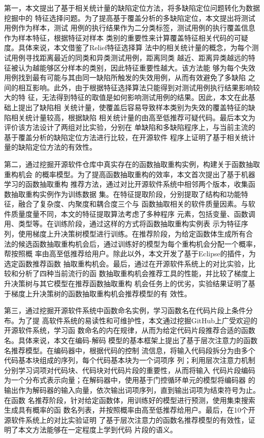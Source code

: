 第一，本文提出了基于相关统计量的缺陷定位方法，将多缺陷定位问题转化为数据挖掘中的
特征选择问题。为了提高基于覆盖分析的多缺陷定位，本文提出将测试用例作为样本，测试
用例的执行结果作为二分类标签，测试用例的执行覆盖信息作为样本特征，根据特征对样本
类别的重要性来计算覆盖特征相关代码的可疑度。具体来说，本文借鉴了Relief特征选择算
法中的相关统计量的概念，为每个测试用例寻找距离最近的同类和异类测试用例，距离同类
越近、距离异类越远的特征被认为越能够区分样本的类别，因此特征重要性越大。该方法能
够为每个失效用例找到最有可能与其由同一缺陷所触发的失效用例，从而有效避免了多缺陷
之间的相互影响。此外，由于根据特征选择算法只能得到对测试用例执行结果影响较大的特
征，无法得到特征的取值是如何影响测试用例的结果。因此，本文在此基础上提出了缺陷相
关统计量，使覆盖后容易导致样本类别为失效的覆盖特征的缺陷相关统计量较高，根据缺陷
相关统计量的由高至低推荐可疑代码。最后本文为评价该方法设计了两组对比实验，分别在
单缺陷和多缺陷程序上，与当前主流的基于覆盖分析的缺陷定位方法进行比较，在开源软件
程序上证明了基于相关统计量的缺陷定位方法的有效性。

第二，通过挖掘开源软件仓库中真实存在的函数抽取重构实例，构建关于函数抽取重构机会
的概率模型。为了提高函数抽取重构的效率，本文首次提出了基于机器学习的函数抽取重构
推荐方法，通过对比开源软件系统中相邻两个版本，收集函数抽取重构实例作为训练数据
集。在特征提取阶段，分别提取了结构和功能特征，融合了复杂度、内聚度和耦合度三个与
函数抽取相关的软件质量因素。与软件质量度量不同，本文的特征提取算法考虑了多种程序
元素，包括变量、函数调用、类型等。在训练阶段，通过这样的方式将函数抽取重构实例表
示为特征序列，使用梯度上升决策树模型进行训练。在推荐阶段，为给定函数体生成所有合
法的候选函数抽取重构机会后，通过训练好的模型为每个重构机会分配一个概率，帮按照概
率由高至低推荐给用户。除此以外，本文开发了基于Eclipse的插件，为选定函数推荐函数
抽取重构机会。最后，通过在开源软件系统上的对比实验，比较和分析了四种当前流行的函
数抽取重构机会推荐工具的性能，并比较了梯度上升决策树与其它模型在推荐函数抽取重构
机会任务上的优劣，实验结果证明了基于梯度上升决策树的函数抽取重构机会推荐模型的有
效性。

第三，通过挖掘开源软件系统中函数命名实例，学习函数名在代码片段上条件分布。为了提
高软件系统的易读性和可维护性，本文通过挖掘GitHub上广受欢迎的开源软件系统，学习函
数命名的内在规律，从而为给定代码片段推荐合适的函数名。具体来说，本文在编码-解码
模型的基本框架上提出了基于层次注意力的函数名推荐模型。在编码器中，根据代码的控制
流信息，将输入代码段拆分为由多个代码基本块组成的序列，每个代码基本块为一个词项序
列；利用层次注意力机制分别学习词项对代码块、代码块对代码片段的重要性，从而将输入
代码片段编码为一个分布式表示向量；在解码器中，使用基于门控循环单元的模型将编码器
的输出作为解码器的输入向量，依次输出词项序列，直到输出词项为结束符号为止。在函数
名推荐阶段，针对给定函数体，用训练好的模型进行预测，使用集束搜索生成具有概率的函
数名列表，并按照概率由高至低推荐给用户。最后，在10个开源软件系统上的对比实验证明
了基于层次注意力的函数名推荐模型的有效性，证明了本文方法能够在一定程度上学到代码
片段的语义。

